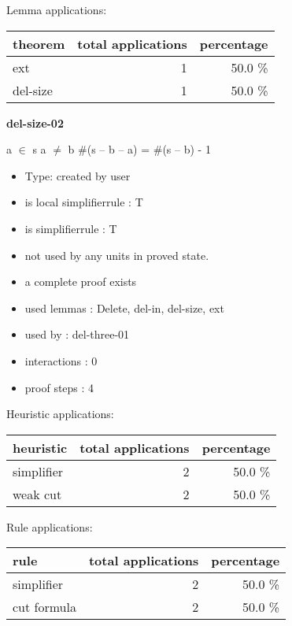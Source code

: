 \documentclass[a4paper]{article}
\begin{document}
Lemma applications:

\begin{supertabular}{l|r|r}
theorem	        & total applications & percentage \\ \hline
ext & 1 & 50.0 \% \\
del-size & 1 & 50.0 \% \\

\end{supertabular}
\pagebreak

{\LARGE\bf del-size-02}\label{lemma-del-size-02}

\medskip

 \Fol a $\in$ s \And a $\neq$ b \Imp \#(s -- b -- a) = \#(s -- b) - 1

\begin{itemize}

\item Type: created by user

\item is local simplifierrule : T
\item is simplifierrule : T
\item not used by any units in proved state.
\item       a complete proof exists
\item       used lemmas  : Delete, del-in, del-size, ext
\item       used by      : del-three-01
\item       interactions : 0
\item       proof steps  : 4
\end{itemize}

\medskip


Heuristic applications:

\begin{supertabular}{l|r|r}
heuristic	& total applications & percentage \\ \hline
simplifier & 2 & 50.0 \% \\
weak cut & 2 & 50.0 \% \\

\end{supertabular}

Rule applications:

\begin{supertabular}{l|r|r}
rule	        & total applications & percentage \\ \hline
simplifier & 2 & 50.0 \% \\
cut formula & 2 & 50.0 \% \\

\end{supertabular}
\end{document}
